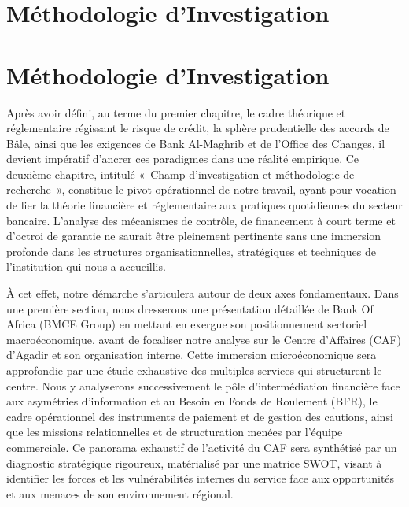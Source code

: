 \chapter{Méthodologie d'Investigation}

\newpage

\chapter*{Méthodologie d'Investigation}

Après avoir défini, au terme du premier chapitre, le cadre théorique et réglementaire régissant le risque de crédit, la sphère prudentielle des accords de Bâle, ainsi que les exigences de Bank Al-Maghrib et de l'Office des Changes, il devient impératif d'ancrer ces paradigmes dans une réalité empirique. Ce deuxième chapitre, intitulé «~Champ d'investigation et méthodologie de recherche~», constitue le pivot opérationnel de notre travail, ayant pour vocation de lier la théorie financière et réglementaire aux pratiques quotidiennes du secteur bancaire. L'analyse des mécanismes de contrôle, de financement à court terme et d'octroi de garantie ne saurait être pleinement pertinente sans une immersion profonde dans les structures organisationnelles, stratégiques et techniques de l'institution qui nous a accueillis.

À cet effet, notre démarche s'articulera autour de deux axes fondamentaux. Dans une première section, nous dresserons une présentation détaillée de Bank Of Africa (BMCE Group) en mettant en exergue son positionnement sectoriel macroéconomique, avant de focaliser notre analyse sur le Centre d'Affaires (CAF) d'Agadir et son organisation interne. Cette immersion microéconomique sera approfondie par une étude exhaustive des multiples services qui structurent le centre. Nous y analyserons successivement le pôle d'intermédiation financière face aux asymétries d'information et au Besoin en Fonds de Roulement (BFR), le cadre opérationnel des instruments de paiement et de gestion des cautions, ainsi que les missions relationnelles et de structuration menées par l'équipe commerciale. Ce panorama exhaustif de l'activité du CAF sera synthétisé par un diagnostic stratégique rigoureux, matérialisé par une matrice SWOT, visant à identifier les forces et les vulnérabilités internes du service face aux opportunités et aux menaces de son environnement régional.


